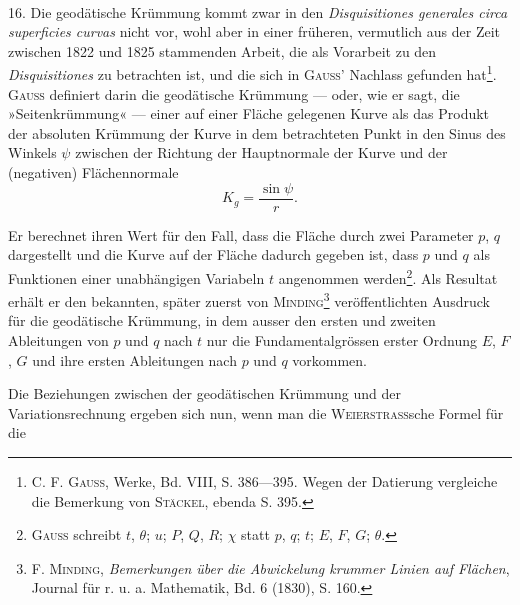 \clearpage\begingroup\NoSourceHead{}
\renewcommand{\thefootnote}{\arabic{footnote})}\setcounter{footnote}{23}
\begin{center}\\
\end{center}
\begin{center}\end{center}
\noindent\hspace*{\parindent}16. Die geodätische Krümmung kommt zwar in den \textit{Disquisitiones generales circa superficies curvas} nicht vor, wohl aber in einer früheren, vermutlich
aus der Zeit zwischen 1822 und 1825 stammenden Arbeit, die als Vorarbeit
\clearpage{}
\noindent zu den \textit{Disquisitiones} zu betrachten ist, und die sich in \textsc{Gauss}' Nachlass gefunden hat\footnote{C. F. \textsc{Gauss}, Werke, Bd. VIII, S. 386—395. Wegen der Datierung vergleiche die Bemerkung
von \textsc{Stäckel}, ebenda S. 395.}. \textsc{Gauss} definiert darin die geodätische Krümmung — oder, wie
er sagt, die »Seitenkrümmung« — einer auf einer Fläche gelegenen Kurve als
das Produkt der absoluten Krümmung der Kurve in dem betrachteten Punkt
in den Sinus des Winkels $\psi$ zwischen der Richtung der Hauptnormale der
Kurve und der (negativen) Flächennormale
\[
K_g=\frac{\sin\psi}{r}.
\]
\par\noindent\hspace*{\parindent}Er berechnet ihren Wert für den Fall, dass die Fläche durch zwei Parameter $p$, $q$ dargestellt und die Kurve auf der Fläche dadurch gegeben ist, dass
$p$ und $q$ als Funktionen einer unabhängigen Variabeln $t$ angenommen werden\footnote{\textsc{Gauss} schreibt $t$, $\theta$; $u$; $P$, $Q$, $R$; $\chi$ statt $p$, $q$; $t$; $E$, $F$, $G$; $\theta$.}.
Als Resultat erhält er den bekannten, später zuerst von \textsc{Minding}\footnote{F. \textsc{Minding}, \textit{Bemerkungen über die Abwickelung krummer Linien auf Flächen}, Journal für r. u. a.
Mathematik, Bd. 6 (1830), S. 160.} veröffentlichten Ausdruck für die geodätische Krümmung, in dem ausser den ersten und
zweiten Ableitungen von $p$ und $q$ nach $t$ nur die Fundamentalgrössen erster
Ordnung $E$, $F$, $G$ und ihre ersten Ableitungen nach $p$ und $q$ vorkommen.
\par\noindent\hspace*{\parindent}Die Beziehungen zwischen der geodätischen Krümmung und der Variationsrechnung ergeben sich nun, wenn man die \textsc{Weierstrass}sche Formel für die

